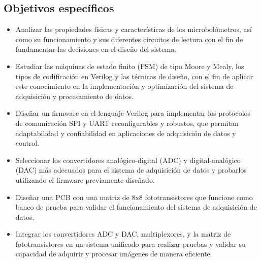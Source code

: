 		\subsection{Objetivos específicos}
			\begin{itemize}
                \item Analizar las propiedades físicas y características de los microbolómetros, así como su funcionamiento y sus diferentes circuitos de lectura con el fin de fundamentar las decisiones en el diseño del sistema.
                \item Estudiar las máquinas de estado finito (FSM) de tipo Moore y Mealy, los tipos de codificación en Verilog y las técnicas de diseño, con el fin de aplicar este conocimiento en la implementación y optimización del sistema de adquisición y procesamiento de datos.
                \item Diseñar un firmware en el lenguaje Verilog para implementar los protocolos de comunicación SPI y UART reconfigurables y robustos, que permitan adaptabilidad y confiabilidad en aplicaciones de adquisición de datos y control.
                \item Seleccionar los convertidores analógico-digital (ADC) y digital-analógico (DAC) más adecuados para el sistema de adquisición de datos y probarlos utilizando el firmware previamente diseñado.
                \item Diseñar una PCB con una matriz de 8x8 fototransistores que funcione como banco de prueba para validar el funcionamiento del sistema de adquisición de datos.
                \item Integrar los convertidores ADC y DAC, multiplexores, y la matriz de fototransistores en un sistema unificado para realizar pruebas y validar su capacidad de adquirir y procesar imágenes de manera eficiente.
			\end{itemize}
